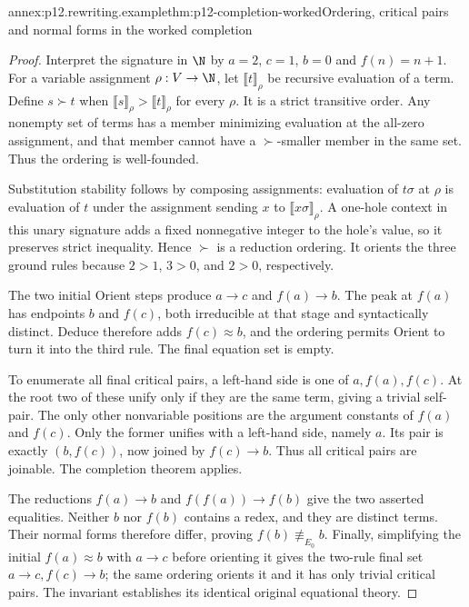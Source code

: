 \begin{annexitem}{annex:p12.rewriting.example}{thm:p12-completion-worked}{Ordering, critical pairs and normal forms in the worked completion}
\begin{proof}
Interpret the signature in \(\N\) by
\(a=2\), \(c=1\), \(b=0\) and \(f(n)=n+1\).
For a variable assignment \(\rho:V\to\N\), let
\(\llbracket t\rrbracket_\rho\) be recursive evaluation of a term.
Define \(s\succ t\) when
\(\llbracket s\rrbracket_\rho>
\llbracket t\rrbracket_\rho\) for every \(\rho\).
It is a strict transitive order. Any nonempty set of terms has a
member minimizing evaluation at the all-zero assignment, and that
member cannot have a \(\succ\)-smaller member in the same set.
Thus the ordering is well-founded.

Substitution stability follows by composing assignments: evaluation
of \(t\sigma\) at \(\rho\) is evaluation of \(t\) under
the assignment sending \(x\) to
\(\llbracket x\sigma\rrbracket_\rho\). A one-hole context in
this unary signature adds a fixed nonnegative integer to the hole's
value, so it preserves strict inequality. Hence \(\succ\) is a
reduction ordering. It orients the three ground rules because
\(2>1\), \(3>0\), and \(2>0\), respectively.

The two initial Orient steps produce \(a\to c\) and
\(f(a)\to b\). The peak at \(f(a)\) has endpoints \(b\)
and \(f(c)\), both irreducible at that stage and syntactically
distinct. Deduce therefore adds \(f(c)\approx b\), and the
ordering permits Orient to turn it into the third rule. The final
equation set is empty.

To enumerate all final critical pairs, a left-hand side is one of
\(a,f(a),f(c)\). At the root two of these unify only if they are
the same term, giving a trivial self-pair. The only other nonvariable
positions are the argument constants of \(f(a)\) and \(f(c)\).
Only the former unifies with a left-hand side, namely \(a\).
Its pair is exactly \((b,f(c))\), now joined by \(f(c)\to b\).
Thus all critical pairs are joinable. The completion theorem applies.

The reductions \(f(a)\to b\) and
\(f(f(a))\to f(b)\) give the two asserted equalities.
Neither \(b\) nor \(f(b)\) contains a redex, and they are distinct
terms. Their normal forms therefore differ, proving
\(f(b)\not\equiv_{E_0}b\). Finally, simplifying the initial
\(f(a)\approx b\) with \(a\to c\) before orienting it gives
the two-rule final set \(a\to c,f(c)\to b\); the same ordering
orients it and it has only trivial critical pairs. The invariant
establishes its identical original equational theory.
\end{proof}
\end{annexitem}
